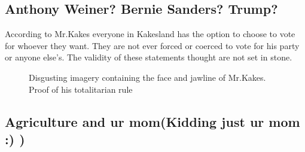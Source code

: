 \documentclass[fleqn]{article}
\newcommand{\3}{\vspace*{3mm}}
\begin{document}
\3

\subsection*{Anthony Weiner? Bernie Sanders? Trump?}

\3

According to Mr.Kakes everyone in Kakesland has the option to choose to vote for whoever they want. They are not ever forced or coerced to vote for his party or anyone else's. The validity of these statements thought are not set in stone.

\3

 \begin{figure}[!hbt]
 \begin{center}
 \begin{minipage}{0.85\textwidth}
 \caption{\label{MIDDLE}\small{Disgusting imagery containing the face and jawline of Mr.Kakes. Proof of his totalitarian rule }}
 \end{minipage}
 \end{center}
 \end{figure}


\subsection*{Agriculture and ur mom(Kidding just ur mom :) )}
\end{document}
